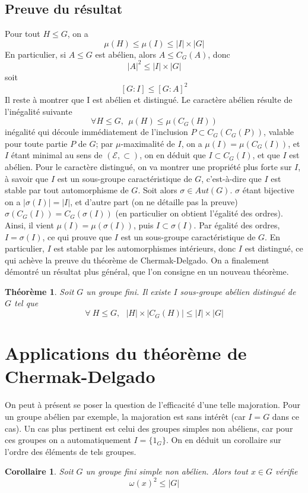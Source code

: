 \documentclass[10pt,a4paper]{article}
\newtheorem{theorem}{Théorème}
\newtheorem{cor}{Corollaire}
\begin{document}
\subsection{Preuve du résultat}
Pour tout $H \leq G$, on a
$$\mu (H) \leq \mu (I) \leq |I|\times |G|$$
En particulier, si $A \leq G$ est abélien, alors $A \leq C_{G}(A)$, donc
$$|A|^{2} \leq |I|\times |G|$$
soit
$$ [G:I] \leq [G:A]^{2}$$
Il reste à montrer que I est abélien et distingué. Le caractère abélien résulte de l'inégalité suivante
$$ \forall H \leq G , \:\: \mu (H) \leq \mu (C_{G}(H))$$
inégalité qui découle immédiatement de l'inclusion $P \subset C_{G}(C_{G}(P))$, valable pour toute partie $P$ de $G$; par $\mu$-maximalité de $I$, on a $\mu(I)=\mu(C_{G}(I))$, et $I$ étant minimal au sens de $(\mathcal{E} , \subset )$, on en déduit que $I \subset C_{G}(I)$, et que $I$ est abélien.
\newline
Pour le caractère distingué, on va montrer une propriété plus forte sur $I$, à savoir que $I$ est un sous-groupe caractéristique de $G$, c'est-à-dire que $I$ est stable par tout automorphisme de $G$. Soit alors $\sigma \in Aut(G)$. $\sigma$ étant bijective on a $|\sigma (I) | = |I|$, et d'autre part (on ne détaille pas la preuve) $\sigma (C_{G}(I))=C_{G}(\sigma(I))$ (en particulier on obtient l'égalité des ordres). Ainsi, il vient $\mu(I)=\mu(\sigma(I))$, puis $I \subset \sigma(I)$. Par égalité des ordres, $I=\sigma (I)$, ce qui prouve que $I$ est un sous-groupe caractéristique de $G$. En particulier, $I$ est stable par les automorphismes intérieurs, donc $I$ est distingué, ce qui achève la preuve du théorème de Chermak-Delgado.
\newline
On a finalement démontré un résultat plus général, que l'on consigne en un nouveau théorème.
\begin{theorem}
    Soit $G$ un groupe fini. Il existe $I$ sous-groupe abélien distingué de $G$ tel que
    $$\forall \: H \leq G, \:\:\: |H| \times |C_{G}(H)| \leq |I| \times |G|$$
\end{theorem}
\section{Applications du théorème de Chermak-Delgado}
On peut à présent se poser la question de l'efficacité d'une telle majoration. Pour un groupe abélien par exemple, la majoration est sans intérêt (car $I=G$ dans ce cas). Un cas plus pertinent est celui des groupes simples non abéliens, car pour ces groupes on a automatiquement $I=\{1_{G}\}$. On en déduit un corollaire sur l'ordre des éléments de tels groupes.
\begin{cor}
    Soit $G$ un groupe fini simple non abélien. Alors tout $x \in G$ vérifie $$\omega (x) ^{2} \leq |G|$$
\end{cor}
\end{document}
